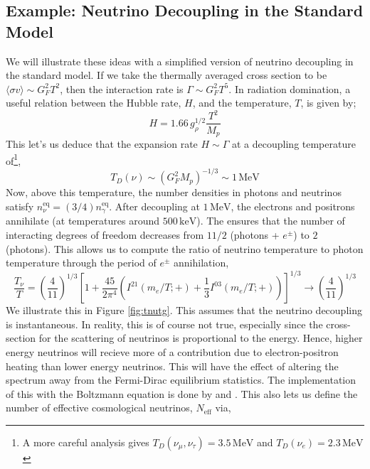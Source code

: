 \documentclass[11pt]{article}
\numberwithin{equation}{section}
\numberwithin{figure}{section}
\numberwithin{table}{section}
\begin{document}
\subsection{Example: Neutrino Decoupling in the Standard Model}
We will illustrate these ideas with a simplified version of neutrino decoupling in the standard model. If we take the thermally averaged cross section to be $\langle \sigma v \rangle \sim G_F^2 T^2$, then the interaction rate is $\Gamma \sim G_F^2 T^5$. In radiation domination, a useful relation between the Hubble rate, $H$, and the temperature, $T$, is given by;
\begin{equation}
H = 1.66 \, g_\rho^{1/2}\frac{T^2}{M_p}
\end{equation}
This let's us deduce that the expansion rate $H \sim \Gamma$ at a decoupling temperature of\footnote{A more careful analysis \citep{Dicus:1982cb} gives $T_D(\nu_\mu, \nu_\tau) = 3.5 \, \mathrm{MeV}$ and $T_D(\nu_e) = 2.3 \, \mathrm{MeV}$},
\begin{equation}
T_D(\nu) \sim (G_F^2 M_p)^{-1/3} \sim 1\,\mathrm{MeV}
\end{equation}
Now, above this temperature, the number densities in photons and neutrinos satisfy $n_\nu^{\mathrm{eq}} = (3/4)n_\gamma^{\mathrm{eq}}$. After decoupling at $1 \, \mathrm{MeV}$, the electrons and positrons annihilate (at temperatures around $500 \, \mathrm{keV}$). The ensures that the number of interacting degrees of freedom decreases from $11/2$ (photons + $e^{\pm}$) to $2$ (photons). This allows us to compute the ratio of neutrino temperature to photon temperature through the period of $e^{\pm}$ annihilation,
\begin{equation}
\frac{T_\nu}{T} = \left(\frac{4}{11}\right)^{1/3}\left[1 + \frac{45}{2\pi^4}\left(I^{21}(m_e/T; +) + \frac{1}{3}I^{03}(m_e/T; +)\right)\right]^{1/3} \rightarrow \left(\frac{4}{11}\right)^{1/3}
\end{equation}
We illustrate this in Figure \ref{fig:tnutg}. This assumes that the neutrino decoupling is instantaneous. In reality, this is of course not true, especially since the cross-section for the scattering of neutrinos is proportional to the energy. Hence, higher energy neutrinos will recieve more of a contribution due to electron-positron heating than lower energy neutrinos. This will have the effect of altering the spectrum away from the Fermi-Dirac equilibrium statistics. The implementation of this with the Boltzmann equation is done by \citet{Dodelson:1992km} and \citet{Hannestad:1995rs}. This also lets us define the number of effective cosmological neutrinos, $N_{\mathrm{eff}}$ via,
\end{document}
